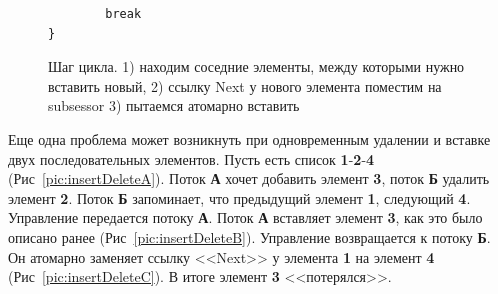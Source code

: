 \documentclass[12pt]{article}
\begin{document}
{\begin{figure}[h]
\begin{lstlisting}
		break
}
					\end{lstlisting}
					\caption{Шаг цикла. 1) находим соседние элементы, между которыми нужно вставить новый, 2) ссылку Next у нового элемента поместим на subsessor 3) пытаемся атомарно вставить}
					\label{pic:whileCas}
				\end{figure}
				\par Еще одна проблема может возникнуть при одновременным удалении и вставке двух последовательных элементов. Пусть есть список \textbf{1}-\textbf{2}-\textbf{4} (Рис~\ref{pic:insertDeleteA}). Поток \textbf{А} хочет добавить элемент \textbf{3}, поток \textbf{Б} удалить элемент \textbf{2}. Поток \textbf{Б} запоминает, что предыдущий элемент \textbf{1}, следующий \textbf{4}. Управление передается потоку \textbf{А}. Поток \textbf{А} вставляет элемент \textbf{3}, как это было описано ранее (Рис~\ref{pic:insertDeleteB}). Управление возвращается к потоку \textbf{Б}. Он атомарно заменяет ссылку <<Next>> у элемента \textbf{1} на элемент \textbf{4} (Рис~\ref{pic:insertDeleteC}). В итоге элемент \textbf{3} <<потерялся>>.
				\begin{figure}[h!]
					\begin{minipage}[h]{0.45\linewidth}
						\center  {}
					\end{minipage}
					\hfill
					\begin{minipage}[h]{0.45\linewidth}
						\center {}
					\end{minipage}
					\vfill
					\begin{minipage}[h]{0.45\linewidth}
						\center {}
\end{minipage}
\end{figure}}
\end{document}
